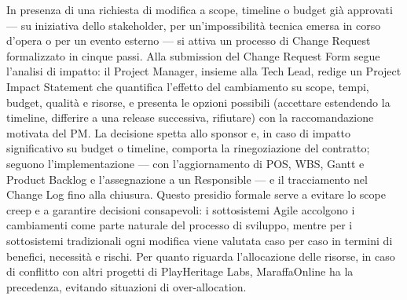 In presenza di una richiesta di modifica a scope, timeline o budget già approvati --- su iniziativa dello stakeholder, per un'impossibilità tecnica emersa in corso d'opera o per un evento esterno --- si attiva un processo di Change Request formalizzato in cinque passi. Alla submission del Change Request Form segue l'analisi di impatto: il Project Manager, insieme alla Tech Lead, redige un Project Impact Statement che quantifica l'effetto del cambiamento su scope, tempi, budget, qualità e risorse, e presenta le opzioni possibili (accettare estendendo la timeline, differire a una release successiva, rifiutare) con la raccomandazione motivata del PM. La decisione spetta allo sponsor e, in caso di impatto significativo su budget o timeline, comporta la rinegoziazione del contratto; seguono l'implementazione --- con l'aggiornamento di POS, WBS, Gantt e Product Backlog e l'assegnazione a un Responsible --- e il tracciamento nel Change Log fino alla chiusura. Questo presidio formale serve a evitare lo scope creep e a garantire decisioni consapevoli: i sottosistemi Agile accolgono i cambiamenti come parte naturale del processo di sviluppo, mentre per i sottosistemi tradizionali ogni modifica viene valutata caso per caso in termini di benefici, necessità e rischi. Per quanto riguarda l'allocazione delle risorse, in caso di conflitto con altri progetti di PlayHeritage Labs, MaraffaOnline ha la precedenza, evitando situazioni di over-allocation.
